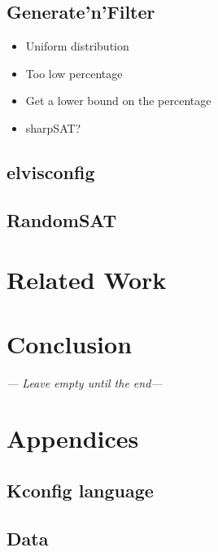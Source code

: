 \documentclass[a4paper,11pt]{report}
\begin{document}
\section{Generate'n'Filter}



\begin{itemize}
    \item Uniform distribution
    \item Too low percentage
    \item Get a lower bound on the percentage
    \item sharpSAT?
\end{itemize}

\section{elvisconfig}


\section{RandomSAT}

\newpage
\chapter{Related Work}

\newpage
\chapter{Conclusion}
\emph{--- Leave empty until the end---}




\newpage



\newpage

\chapter{Appendices}
\section{Kconfig language}
\section{Data}
\end{document}
